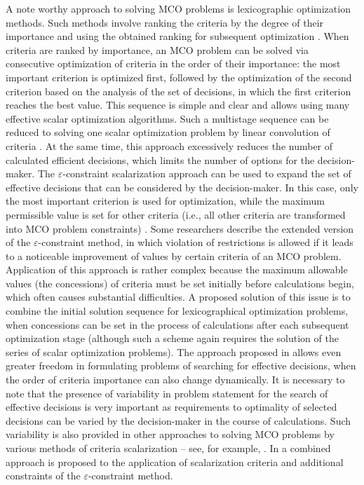 \documentclass[smallextended]{svjour3}       %
\begin{document}
A note worthy approach to solving MCO problems is lexicographic optimization methods. Such methods involve ranking the criteria by the degree of their importance and using the obtained ranking for subsequent optimization \cite{c3}. When criteria are ranked by importance, an MCO problem can be solved via consecutive optimization of criteria in the order of their importance: the most important criterion is optimized first, followed by the optimization of the second criterion based on the analysis of the set of decisions, in which the first criterion reaches the best value. This sequence is simple and clear and allows using many effective scalar optimization algorithms. Such a multistage sequence can be reduced to solving one scalar optimization problem by linear convolution of criteria \cite{c38}. At the same time, this approach excessively reduces the number of calculated efficient decisions, which limits the number of options for the decision-maker. The $\varepsilon$-constraint scalarization approach can be used to expand the set of effective decisions that can be considered by the decision-maker. In this case, only the most important criterion is used for optimization, while the maximum permissible value is set for other criteria (i.e., all other criteria are transformed into MCO problem constraints) \cite{c39,c40}. Some researchers \cite{c41} describe the extended version of the $\varepsilon$-constraint method, in which violation of restrictions is allowed if it leads to a noticeable improvement of values by certain criteria of an MCO problem. Application of this approach is rather complex because the maximum allowable values (the concessions) of criteria must be set initially before calculations begin, which often causes substantial difficulties. A proposed solution \cite{c42} of this issue is to combine the initial solution sequence for lexicographical optimization problems, when concessions can be set in the process of calculations after each subsequent optimization stage (although such a scheme again requires the solution of the series of scalar optimization problems). The approach proposed in \cite{c43} allows even greater freedom in formulating problems of searching for effective decisions, when the order of criteria importance can also change dynamically. It is necessary to note that the presence of variability in problem statement for the search of effective decisions is very important as requirements to optimality of selected decisions can be varied by the decision-maker in the course of calculations. Such variability is also provided in other approaches to solving MCO problems by various methods of criteria scalarization -- see, for example, \cite{c31,c44}. In \cite{c1} a combined approach is proposed to the application of scalarization criteria and additional constraints of the $\varepsilon$-constraint method.
\end{document}
